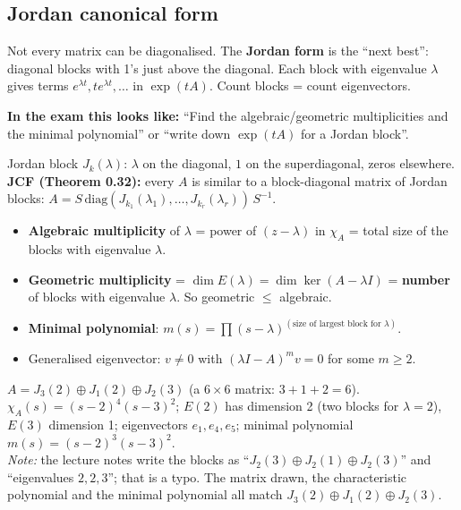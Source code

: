 \subsection{Jordan canonical form \texorpdfstring{}{}}\label{sec:jordan}\label{ss:3-8}
\begin{plainbox}
Not every matrix can be diagonalised. The \textbf{Jordan form} is the ``next best'': diagonal blocks with 1's just above the diagonal.
Each block with eigenvalue $\lambda$ gives terms $e^{\lambda t}, te^{\lambda t}, \dots$ in $\exp(tA)$. Count blocks = count eigenvectors.
\par\smallskip\textbf{In the exam this looks like:} ``Find the algebraic/geometric multiplicities and the minimal polynomial'' or ``write down $\exp(tA)$ for a Jordan block''.
\end{plainbox}
\begin{defbox}
Jordan block $J_k(\lambda)$: $\lambda$ on the diagonal, $1$ on the superdiagonal, zeros elsewhere.
\textbf{JCF (Theorem 0.32):} every $A$ is similar to a block-diagonal matrix of Jordan blocks: $A=S\,\mathrm{diag}(J_{k_1}(\lambda_1),\dots,J_{k_r}(\lambda_r))\,S^{-1}$.
\begin{itemize}
\item \textbf{Algebraic multiplicity} of $\lambda$ = power of $(z-\lambda)$ in $\chi_A$ = total size of the blocks with eigenvalue $\lambda$.
\item \textbf{Geometric multiplicity} = $\dim E(\lambda)=\dim\ker(A-\lambda I)$ = \textbf{number} of blocks with eigenvalue $\lambda$. So geometric $\le$ algebraic.
\item \textbf{Minimal polynomial}: $m(s)=\prod(s-\lambda)^{(\text{size of largest block for }\lambda)}$.
\item Generalised eigenvector: $v\neq0$ with $(\lambda I-A)^mv=0$ for some $m\ge2$.
\end{itemize}
\end{defbox}
\begin{workbox}[title={Worked example \fr{119--120} (corrected)}]
$A=J_3(2)\oplus J_1(2)\oplus J_2(3)$ (a $6\times6$ matrix: $3+1+2=6$).
$\chi_A(s)=(s-2)^4(s-3)^2$; $E(2)$ has dimension 2 (two blocks for $\lambda=2$), $E(3)$ dimension 1; eigenvectors $e_1,e_4,e_5$;
minimal polynomial $m(s)=(s-2)^3(s-3)^2$.\\
\textit{Note:} the lecture notes write the blocks as ``$J_2(3)\oplus J_2(1)\oplus J_2(3)$'' and ``eigenvalues $2,2,3$''; that is a typo. The matrix drawn, the characteristic polynomial and the minimal polynomial all match $J_3(2)\oplus J_1(2)\oplus J_2(3)$.
\end{workbox}
